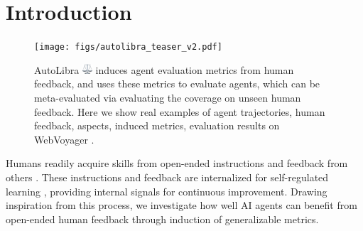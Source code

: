 \section{Introduction}

\begin{figure}[!t]
	\centering
	\texttt{[image: figs/autolibra\_teaser\_v2.pdf]}
	\caption{AutoLibra \protect
	\includegraphics[height=1em]{figs/scale.png}
	induces agent evaluation metrics from human feedback, and uses these metrics to
	evaluate agents, which can be meta-evaluated via evaluating the coverage on
	unseen human feedback. Here we show real examples of agent trajectories, human
	 feedback, aspects, induced metrics, evaluation results on WebVoyager \citep{he2024webvoyager}. 
     \vspace{-20pt}
    }
	\label{fig:teaser}
\end{figure}

Humans readily acquire skills from open-ended instructions and feedback from others
\citep{tomasello1993cultural}. These instructions and feedback are internalized for
self-regulated learning \citep{pintrich2002development,nicol2006formative}, providing
internal signals for continuous improvement. Drawing inspiration from this
process, we investigate how well AI agents can benefit from open-ended human feedback
through induction of generalizable metrics.


